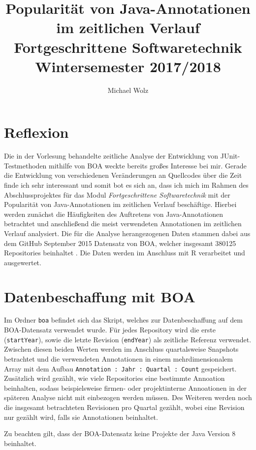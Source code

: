 \documentclass[11pt,a4paper,parskip=full]{scrartcl}
\author{Michael Wolz}
\title{Popularität von Java-Annotationen im zeitlichen Verlauf\\\Large{Fortgeschrittene Softwaretechnik}\\ \large{Wintersemester 2017/2018}}
\begin{document}
\maketitle

\section{Reflexion}

Die in der Vorlesung behandelte zeitliche Analyse der Entwicklung von JUnit-Testmetho\-den mithilfe von BOA weckte bereits großes Interesse bei mir. Gerade die Entwicklung von verschiedenen Veränderungen an Quellcodes über die Zeit finde ich sehr interessant und somit bot es sich an, dass ich mich im Rahmen des Abschlussprojektes für das Modul \textit{Fortgeschrittene Softwaretechnik} mit der Popularität von Java-Annotationen im zeitlichen Verlauf beschäftige. Hierbei werden zunächst die Häufigkeiten des Auftretens von Java-Annotationen betrachtet und anschließend die meist verwendeten Annotationen im zeitlichen Verlauf analysiert. Die für die Analyse herangezogenen Daten stammen dabei aus dem GitHub September 2015 Datensatz von BOA, welcher insgesamt 380125 Repositories beinhaltet \cite{boadatasetstats}. Die Daten werden im Anschluss mit R verarbeitet und ausgewertet.

\section{Datenbeschaffung mit BOA}

Im Ordner \texttt{boa} befindet sich das Skript, welches zur Datenbeschaffung auf dem BOA-Datensatz verwendet wurde. Für jedes Repository wird die erste (\texttt{startYear}), sowie die letzte Revision (\texttt{endYear}) als zeitliche Referenz verwendet. Zwischen diesen beiden Werten werden im Anschluss quartalsweise Snapshots betrachtet und die verwendeten Annotationen in einem mehrdimensionalem Array mit dem Aufbau \texttt{Annotation : Jahr : Quartal : Count} gespeichert. Zusätzlich wird gezählt, wie viele Repositories eine bestimmte Annoation beinhalten, sodass beispielsweise firmen- oder projektinterne Annoationen in der späteren Analyse nicht mit einbezogen werden müssen. Des Weiteren werden noch die insgesamt betrachteten Revisionen pro Quartal gezählt, wobei eine Revision nur gezählt wird, falls sie Annotationen beinhaltet. \par

Zu beachten gilt, dass der BOA-Datensatz keine Projekte der Java Version 8 beinhaltet. \cite{boadatasetstats} 
\end{document}
